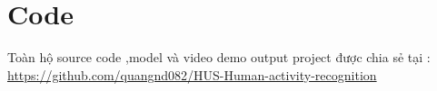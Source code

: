 \chapter*{Code}

\label{Mã nguồn hệ thống}

Toàn hộ source code ,model và video demo output project được chia sẻ tại : \href{https://github.com/quangnd082/HUS-Human-activity-recognition}{https://github.com/quangnd082/HUS-Human-activity-recognition} 


